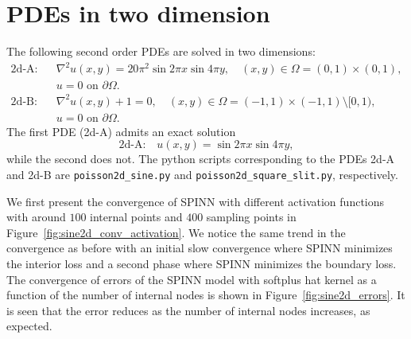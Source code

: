 \documentclass[12pt]{article}
\newcommand{\code}[1]{\lstinline{#1}}
\begin{document}
\section{PDEs in two dimension}
The following second order PDEs are solved in two dimensions:
\begin{displaymath}
\begin{split}
\text{2d-A:}\quad& \nabla^2 u(x,y) = 20\pi^2 \sin 2\pi x \sin 4\pi y, \quad (x, y) \in \Omega = (0,1) \times (0,1),\\
 & u = 0 \text{ on } \partial \Omega.\\
\text{2d-B:}\quad& \nabla^2 u(x,y) + 1 = 0, \quad (x,y) \in \Omega = (-1,1) \times (-1,1) \setminus [0,1),\\
 & u = 0 \text{ on } \partial \Omega.
\end{split} 
\end{displaymath}
The first PDE (2d-A) admits an exact solution
\begin{displaymath}
\text{2d-A:}\quad u(x,y) = \sin 2\pi x \sin 4 \pi y,
\end{displaymath}
while the second does not. The python scripts corresponding to the PDEs 2d-A and 2d-B are \code{poisson2d_sine.py} and \code{poisson2d_square_slit.py}, respectively.

We first present the convergence of SPINN with different activation functions with around $100$ internal points and $400$ sampling points in Figure~\ref{fig:sine2d_conv_activation}. We notice the same trend in the convergence as before with an initial slow convergence where SPINN minimizes the interior loss and a second phase where SPINN minimizes the boundary loss. The convergence of errors of the SPINN model with softplus hat kernel as a function of the number of internal nodes is shown in Figure~\ref{fig:sine2d_errors}. It is seen that the error reduces as the number of internal nodes increases, as expected.
\end{document}
